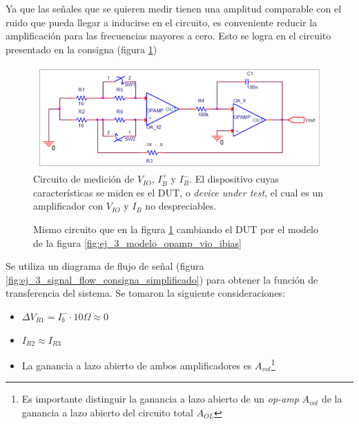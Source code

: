 \documentclass[../../main.tex]{subfiles}
\begin{document}
Ya que las se\~nales que se quieren medir tienen una amplitud comparable con el ruido que pueda llegar a inducirse en el circuito, es conveniente reducir la amplificaci\'on para las frecuencias mayores a cero.  Esto se logra en el circuito presentado en la consigna (figura \ref{fig:ej_3_medicion_vio_consigna})

\begin{figure}[htbp] %
	\centering
	\includegraphics[scale=1]{imagenes/medicion_bias_configuracion_consigna.png}
	\caption{Circuito de medici\'on de $V_{IO}$, $I_B^+$ y $I_B^-$. El dispositivo cuyas caracter\'isticas se miden es el DUT, o \textit{device under test}, el cual es un amplificador con $V_{IO}$ y $I_B$ no despreciables.}
	\label{fig:ej_3_medicion_vio_consigna}
\end{figure}
\begin{figure}[htbp] %
	\centering
	\caption{Mismo circuito que en la figura \ref{fig:ej_3_medicion_vio_consigna} cambiando el DUT por el modelo de la figura \ref{fig:ej_3_modelo_opamp_vio_ibias}}
	\label{fig:ej_3_medicion_vio_consigna_modelando}
\end{figure}

Se utiliza un diagrama de flujo de se\~nal (figura \ref{fig:ej_3_signal_flow_consigna_simplificado}) para obtener la funci\'on de transferencia del sistema. Se tomaron la siguiente consideraciones:
\begin{itemize}
	\item $\Delta V_{R1} = I_b^- \cdot 10\Omega \approx 0$
	\item $I_{R2}\approx I_{R3}$
	\item La ganancia a lazo abierto de ambos amplificadores es $A_{vol}$\footnote{Es importante distinguir la ganancia a lazo abierto de un \textit{op-amp} $A_{vol}$ de la ganancia a lazo abierto del circuito total $A_{OL}$ }
\end{itemize}
\end{document}
